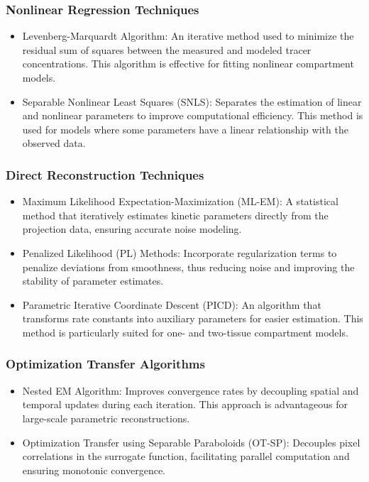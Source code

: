 \subsubsection{Nonlinear Regression Techniques}
\begin{itemize}
    \item Levenberg-Marquardt Algorithm: An iterative method used to minimize the residual sum of squares between the measured and modeled tracer concentrations. This algorithm is effective for fitting nonlinear compartment models.
    \item Separable Nonlinear Least Squares (SNLS): Separates the estimation of linear and nonlinear parameters to improve computational efficiency. This method is used for models where some parameters have a linear relationship with the observed data.
\end{itemize}

\subsubsection{Direct Reconstruction Techniques}
\begin{itemize}
    \item Maximum Likelihood Expectation-Maximization (ML-EM): A statistical method that iteratively estimates kinetic parameters directly from the projection data, ensuring accurate noise modeling.
    \item Penalized Likelihood (PL) Methods: Incorporate regularization terms to penalize deviations from smoothness, thus reducing noise and improving the stability of parameter estimates.
    \item Parametric Iterative Coordinate Descent (PICD): An algorithm that transforms rate constants into auxiliary parameters for easier estimation. This method is particularly suited for one- and two-tissue compartment models.
\end{itemize}

\subsubsection{Optimization Transfer Algorithms}
\begin{itemize}
    \item Nested EM Algorithm: Improves convergence rates by decoupling spatial and temporal updates during each iteration. This approach is advantageous for large-scale parametric reconstructions.
    \item Optimization Transfer using Separable Paraboloids (OT-SP): Decouples pixel correlations in the surrogate function, facilitating parallel computation and ensuring monotonic convergence.
\end{itemize}

